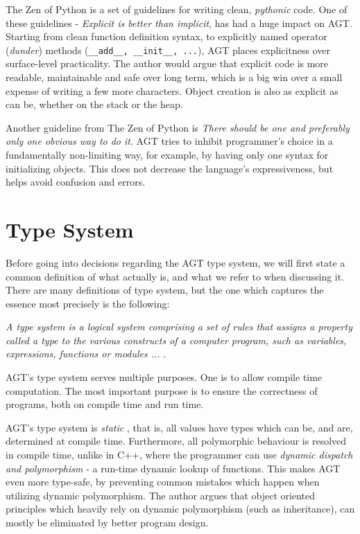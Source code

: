 \documentclass[times, utf8, diplomski]{fer}
\theoremstyle{definition}
\begin{document}
The Zen of Python \citep{c_zen} is a set of guidelines for writing clean, \textit{pythonic} code. 
One of these guidelines - \textit{Explicit is better than implicit}, has had a huge impact on AGT.
Starting from clean function definition syntax, to explicitly named operator (\textit{dunder}) methods
(\texttt{\_\_add\_\_, \_\_init\_\_, ...}), AGT places explicitness over surface-level practicality.
The author would argue that explicit code is more readable, maintainable and safe over long term,
which is a big win over a small expense of writing a few more characters.
Object creation is also as explicit as can be, whether on the stack or the heap.

Another guideline from The Zen of Python is 
\textit{There should be one and preferably only one obvious way to do it}. 
AGT tries to inhibit programmer's choice in a fundamentally non-limiting way, for example, by
having only one syntax for initializing objects. This does not decrease the 
language's expressiveness, but helps avoid confusion and errors.

\section{Type System}

Before going into decisions regarding the AGT type system, we will first state a common
definition of what  actually is, and what we refer to when discussing it.
There are many definitions of type system, 
but the one which captures the essence most precisely is the following:

\textit{A type system is a logical system comprising a set of rules that 
    assigns a property called a type to the various constructs of a computer program, 
such as variables, expressions, functions or modules ... }\citep{c_type_system}.

AGT's type system serves multiple purposes. One is to allow compile time computation.
The most important purpose is to ensure the correctness of programs, both on compile time and run time.

AGT's type system is \textit{static} \citep{c_static_typing}, that is, 
all values have types which can be, and are, determined
at compile time. Furthermore, all polymorphic behaviour is resolved in compile time, unlike in C++,
where the programmer can use \textit{dynamic dispatch and polymorphism} \citep{c_dyn_dispatch} 
- a run-time dynamic lookup of functions.
This makes AGT even more type-safe, by preventing common mistakes which happen when utilizing
dynamic polymorphism. The author argues that object oriented principles which heavily rely on
dynamic polymorphism (such as inheritance), can mostly be eliminated by better program design.
\end{document}
